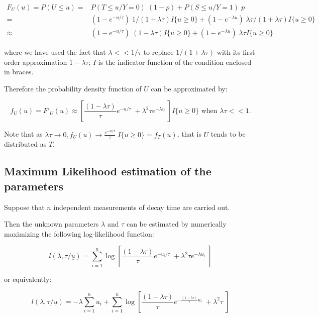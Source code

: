 \documentclass[11pt,A4paper]{article}
\begin{document}
\begin{align*}
F_U(u) 	= P(U \leq u) 	= & P(T \leq u /Y\!=\!0) \; (1-p) + P(S \leq u /Y\!=\!1) \; p \\
						= & (1 - e^{-u/\tau}) \; 1/(1 + \lambda \tau) I\{u \geq 0\} + 
							(1 - e^{-\lambda u}) \; \lambda \tau /(1 + \lambda \tau) I\{u \geq 0\} \\
						\approx & (1 - e^{-u/\tau}) \; (1 - \lambda \tau) I\{u \geq 0\} +
							 (1 - e^{-\lambda u}) \; \lambda \tau I\{u \geq 0\}
\end{align*}

where we have used the fact that $\lambda << 1/\tau$ to replace $1/(1 + \lambda \tau)$ with its first order approximation $1 - \lambda \tau$; $I{}$ is the indicator function of the condition enclosed in braces.

\medskip
Therefore the probability density function of $U$ can be approximated by:

\[
f_U(u) = F'_U(u) \approx \left[ \frac{(1 - \lambda \tau)}{\tau} e^{-u/\tau} \; + \lambda^2 \tau e^{-\lambda u} \; \right] I\{u \geq 0\}
\textrm{ when } \lambda \tau << 1.
\]

Note that as $\lambda \tau \to 0, f_U(u) \to \frac{e^{-u/\tau}}{\tau} \; I\{u \geq 0\} = f_T(u)$, that is $U$ tends to be distributed as $T$.

\subsection{Maximum Likelihood estimation of the parameters}
Suppose that $n$ independent measurements of decay time are carried out.

Then the unknown parameters $\lambda$ and $\tau$ can be estimated by numerically maximizing the following log-likelihood function:

\[
l(\lambda, \tau / \underline{u}) = \sum_{i=1}^{n} \log \left[ \frac{(1 - \lambda \tau)}{\tau} e^{-u_i/\tau} \; + \lambda^2 \tau e^{-\lambda u_i} \; \right]
\]

or equivalently:

\[
l(\lambda, \tau / \underline{u}) = -\lambda \sum_{i=1}^{n} u_i + 
											\sum_{i=1}^{n} {\log \left[ \frac{(1 - \lambda \tau)}{\tau} e^{-\frac{(1 - \lambda \tau)}{\tau} u_i} \; + \lambda^2 \tau \; \right]}
\]


\fi
\end{document}
